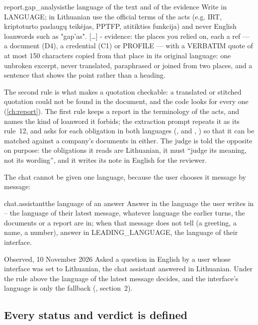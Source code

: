\begin{promptexcerpt}{report.gap_analysis}{the language of the text and of the evidence}
Write in {LANGUAGE}; in Lithuanian use the official
terms of the acts (e.g. IRT, kriptoturto paslaugų teikėjas, PPTFP, atitikties
funkcija) and never English loanwords such as "gap'as".
[…]
- evidence: the places you relied on, each a ref — a document (D4), a credential
  (C1) or PROFILE — with a VERBATIM quote of at most 150 characters copied from that
  place in its original language: one unbroken excerpt, never translated,
  paraphrased or joined from two places, and a sentence that shows the point rather
  than a heading.
\end{promptexcerpt}

The second rule is what makes a quotation checkable: a translated or stitched quotation could
not be found in the document, and the code looks for every one (\cref{ch:report}). The first
rule keeps a report in the terminology of the acts, and names the kind of loanword it forbids;
the extraction prompt repeats it as its rule~12, and asks for each obligation in both languages
(,  and , ) so that it can be matched
against a company's documents in either. The judge is told the opposite on purpose:
the obligations it reads are Lithuanian, it must \enquote{judge its meaning, not its wording},
and it writes its note in English for the reviewer.

The chat cannot be given one language, because the user chooses it message by message:

\begin{promptexcerpt}{chat.assistant}{the language of an answer}
Answer in the language the user writes in – the language of their latest message, whatever language the earlier turns, the documents or a report are in; when that message does not tell (a greeting, a name, a number), answer in {LEADING_LANGUAGE}, the language of their interface.
\end{promptexcerpt}

\begin{lessonbox}{Observed, 10 November 2026}
Asked a question in English by a user whose interface was set to Lithuanian, the chat assistant
answered in Lithuanian. Under the rule above the language of the latest message decides, and
the interface's language is only the fallback
(, section~2).
\end{lessonbox}

\subsection{Every status and verdict is defined}

